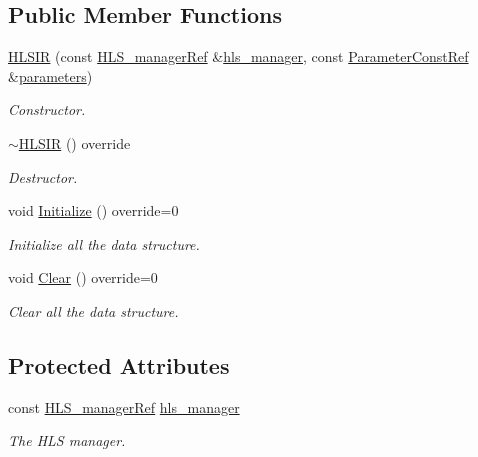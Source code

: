 \subsection*{Public Member Functions}
\begin{DoxyCompactItemize}
\item 
\hyperlink{classHLSIR_a5a2ee90d58d5a7653315ed9bd40b9d45}{H\+L\+S\+IR} (const \hyperlink{hls__manager_8hpp_acd3842b8589fe52c08fc0b2fcc813bfe}{H\+L\+S\+\_\+manager\+Ref} \&\hyperlink{classHLSIR_a19d757a0d26d351ad3560310b981e2ac}{hls\+\_\+manager}, const \hyperlink{Parameter_8hpp_a37841774a6fcb479b597fdf8955eb4ea}{Parameter\+Const\+Ref} \&\hyperlink{classIntermediateRepresentation_a1dec82655a3ccf5023a1d3bb9805ce8c}{parameters})
\begin{DoxyCompactList}\small\item\em Constructor. \end{DoxyCompactList}\item 
\hyperlink{classHLSIR_ae33f6261c9be10dc90ba34969ca64911}{$\sim$\+H\+L\+S\+IR} () override
\begin{DoxyCompactList}\small\item\em Destructor. \end{DoxyCompactList}\item 
void \hyperlink{classHLSIR_a37c3471e94bbb635d9fac51cca161225}{Initialize} () override=0
\begin{DoxyCompactList}\small\item\em Initialize all the data structure. \end{DoxyCompactList}\item 
void \hyperlink{classHLSIR_afba475e313250d56bec388077d032624}{Clear} () override=0
\begin{DoxyCompactList}\small\item\em Clear all the data structure. \end{DoxyCompactList}\end{DoxyCompactItemize}
\subsection*{Protected Attributes}
\begin{DoxyCompactItemize}
\item 
const \hyperlink{hls__manager_8hpp_acd3842b8589fe52c08fc0b2fcc813bfe}{H\+L\+S\+\_\+manager\+Ref} \hyperlink{classHLSIR_a19d757a0d26d351ad3560310b981e2ac}{hls\+\_\+manager}
\begin{DoxyCompactList}\small\item\em The H\+LS manager. \end{DoxyCompactList}\end{DoxyCompactItemize}


